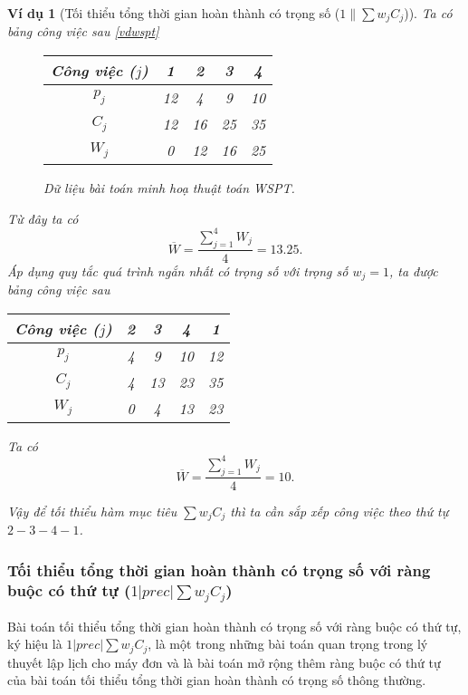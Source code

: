 \documentclass[12pt,a4paper]{report}
\newtheorem{vd}{Ví dụ}
\begin{document}
\begin{vd}[Tối thiểu tổng thời gian hoàn thành có trọng số ($1 \| \sum w_j C_j$)]
Ta có bảng công việc sau \eqref{vdwspt}

\begin{figure}[h!]
	\centering
	\begin{tabular}{|c | c c c c |} 
	\hline
	Công việc ($j$) & 1 & 2 & 3 & 4 \\
	\hline\hline
	$p_j$ & 12 & 4 & 9 & 10 \\
	$C_j$ & 12 & 16 & 25 & 35 \\
	$W_j$ & 0 & 12 & 16 & 25 \\
	\hline
	\end{tabular}
\caption{\label{vdwspt} Dữ liệu bài toán minh hoạ thuật toán WSPT.}
\end{figure}

Từ đây ta có
\begin{equation*}
\overline{W}=\frac{\sum_{j=1}^{4}W_j}{4} = 13.25.
\end{equation*}
Áp dụng quy tắc quá trình ngắn nhất có trọng số với trọng số $w_j=1$, ta được bảng công việc sau
\begin{table}[h!]
	\centering
	\begin{tabular}{|c | c c c c |} 
	\hline
	Công việc ($j$) & 2 & 3 & 4 & 1 \\
	\hline\hline
	$p_j$ & 4 & 9 & 10 & 12 \\
	$C_j$ & 4 & 13 & 23 & 35 \\
	$W_j$ & 0 & 4 & 13 & 23 \\
	\hline
	\end{tabular}
\end{table}

Ta có
\begin{equation*}
\overline{W}=\frac{\sum_{j=1}^{4}W_j}{4} = 10.
\end{equation*}

Vậy để tối thiểu hàm mục tiêu $\sum w_j C_j$ thì ta cần sắp xếp công việc theo thứ tự $2-3-4-1$.
\end{vd}

\subsubsection*{Tối thiểu tổng thời gian hoàn thành có trọng số với ràng buộc có thứ tự ($1 | prec | \sum w_j C_j$)}
Bài toán tối thiểu tổng thời gian hoàn thành có trọng số với ràng buộc có thứ tự, ký hiệu là $1|prec|\sum w_j C_j$, là một trong những bài toán quan trọng trong lý thuyết lập lịch cho máy đơn và là bài toán mở rộng thêm ràng buộc có thứ tự của bài toán tối thiểu tổng thời gian hoàn thành có trọng số thông thường.
\end{document}
